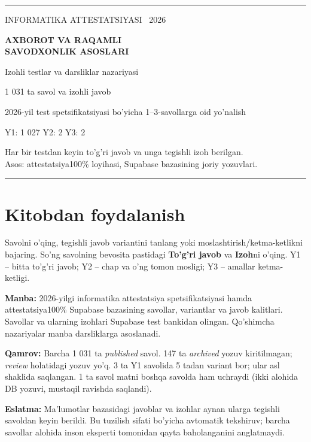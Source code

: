 \documentclass[10pt,a4paper,oneside]{article}
\begin{document}
\begin{titlepage}
\vspace*{26mm}
{\color{teal}\rule{\textwidth}{1.7pt}}\par
\vspace{20mm}
{\Large INFORMATIKA ATTESTATSIYASI \ 2026}\par
\vspace{13mm}
{\fontsize{26}{32}\selectfont\bfseries\color{ink}AXBOROT VA RAQAMLI\\ SAVODXONLIK ASOSLARI}\par
\vspace{10mm}
{\Large Izohli testlar va darsliklar nazariyasi}\par
\vspace{17mm}
{\Large 1 031 ta savol va izohli javob}\par
{\normalsize 2026-yil test spetsifikatsiyasi bo'yicha 1--3-savollarga oid yo'nalish}\par
\vspace{17mm}
{\large Y1: 1 027 \quad Y2: 2 \quad Y3: 2}\par
\vfill
{\color{muted}Har bir testdan keyin to'g'ri javob va unga tegishli izoh berilgan.\\
Asos: attestatsiya100\% loyihasi, Supabase bazasining joriy yozuvlari.}\par
\vspace{12mm}
{\color{teal}\rule{\textwidth}{1.7pt}}
\end{titlepage}
\section*{Kitobdan foydalanish}
Savolni o'qing, tegishli javob variantini tanlang yoki moslashtirish/ketma-ketlikni bajaring.
So'ng savolning bevosita pastidagi \textbf{To'g'ri javob} va \textbf{Izoh}ni o'qing.
Y1 -- bitta to'g'ri javob; Y2 -- chap va o'ng tomon mosligi; Y3 -- amallar ketma-ketligi.
\par\textbf{Manba:} 2026-yilgi informatika attestatsiya spetsifikatsiyasi hamda
attestatsiya100\% Supabase bazasining savollar, variantlar va javob kalitlari.
Savollar va ularning izohlari Supabase test bankidan olingan. Qo'shimcha nazariyalar manba darsliklarga asoslanadi.
\par\textbf{Qamrov:} Barcha 1 031 ta \textit{published} savol. 147 ta \textit{archived} yozuv kiritilmagan;
\textit{review} holatidagi yozuv yo'q. 3 ta Y1 savolida 5 tadan variant bor;
ular asl shaklida saqlangan. 1 ta savol matni boshqa savolda ham uchraydi
(ikki alohida DB yozuvi, mustaqil ravishda saqlandi).
\par\textbf{Eslatma:} Ma'lumotlar bazasidagi javoblar va izohlar aynan ularga tegishli savoldan
keyin berildi. Bu tuzilish sifati bo'yicha avtomatik tekshiruv;
barcha savollar alohida inson eksperti tomonidan qayta baholanganini anglatmaydi.
\tableofcontents
\clearpage
\end{document}
